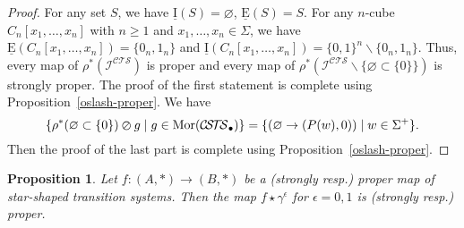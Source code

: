 \documentclass[a4paper,12pt]{amsart}
\newtheorem{prop}[thm]{Proposition}
\begin{document}
\begin{proof} For any set $S$, we have $\operatorname{\underline{I}}(S)=\varnothing$, $\operatorname{\underline{E}}(S)=S$. For
any $n$-cube $C_n[x_1,\dots,x_n]$ with $n{\geqslant} 1$ and $x_1,\dots,x_n\in
\Sigma$, we have $\operatorname{\underline{E}}(C_n[x_1,\dots,x_n]) = \{0_n,1_n\}$ and
$\operatorname{\underline{I}}(C_n[x_1,\dots,x_n]) = \{0,1\}^n \backslash \{0_n,1_n\}$. Thus,
every map of $\rho^*({\mathcal{I}}^{\mathcal{C\!T\!S}})$ is proper and every map of
$\rho^*({\mathcal{I}}^{\mathcal{C\!T\!S}} \backslash \{\varnothing \subset \{0\}\})$ is strongly
proper. The proof of the first statement is complete using
Proposition~\ref{oslash-proper}. We have \[\{\rho^*(\varnothing
\subset \{0\})\varoslash g \mid g\in \operatorname{Mor}({\mathcal{C\!S\!T\!S}}_\bullet)\} =
\{(\varnothing \to (P(w),0)) \mid w\in \Sigma^+\}.\] Then the proof of
the last part is complete using Proposition~\ref{oslash-proper}.  \end{proof}

\begin{prop} \label{ex2} Let $f:(A,*)\to (B,*)$ be a (strongly resp.) proper
map of star-shaped transition systems. Then the map $f \star
\gamma^\epsilon$ for $\epsilon=0,1$ is (strongly resp.) proper. 
\end{prop}
\end{document}
